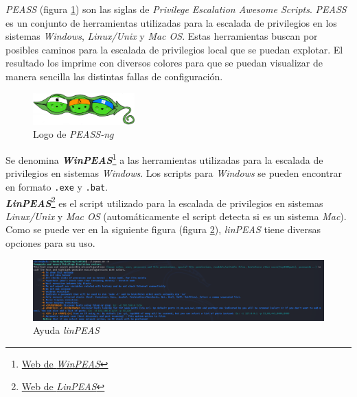 \textit{PEASS}\cite{peas} (figura \ref{fig:peass-logo}) son las siglas de \textit{Privilege Escalation Awesome Scripts}. \textit{PEASS} es un conjunto de herramientas utilizadas para la escalada de privilegios en los sistemas \textit{Windows}, \textit{Linux/Unix} y \textit{Mac OS}. Estas herramientas buscan por posibles caminos para la escalada de privilegios local que se puedan explotar. El resultado los imprime con diversos colores para que se puedan visualizar de manera sencilla las distintas fallas de configuración.\\

\begin{figure}[h]
    \centering
    \includegraphics[width=0.35\textwidth]{images/sections/tools/peass.png}
    \caption{Logo de \textit{PEASS-ng}}
    \label{fig:peass-logo}
\end{figure}

Se denomina \textit{\textbf{WinPEAS}}\footnote{\href{https://github.com/carlospolop/PEASS-ng/tree/master/winPEAS}{Web de \textit{WinPEAS}}} a las herramientas utilizadas para la escalada de privilegios en sistemas \textit{Windows}. Los scripts para \textit{Windows} se pueden encontrar en formato \texttt{.exe} y \texttt{.bat}.\\

\textit{\textbf{LinPEAS}}\footnote{\href{https://github.com/carlospolop/PEASS-ng/tree/master/linPEAS}{Web de \textit{LinPEAS}}} es el script utilizado para la escalada de privilegios en sistemas \textit{Linux/Unix} y \textit{Mac OS} (automáticamente el script detecta si es un sistema \textit{Mac}). Como se puede ver en la siguiente figura (figura \ref{fig:linpeas-help}), \textit{linPEAS} tiene diversas opciones para su uso.

\begin{figure}[h]
    \centering
    \includegraphics[width=1.0\textwidth]{images/sections/tools/linpeas-help.png}
    \caption{Ayuda \textit{linPEAS}}
    \label{fig:linpeas-help}
\end{figure}

